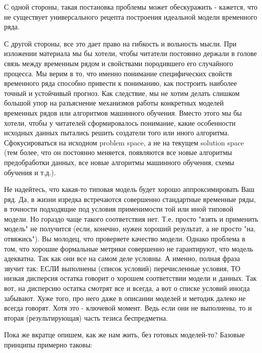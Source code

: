 С одной стороны, такая постановка проблемы может обескуражить -
кажется, что не существует универсального рецепта построения
идеальной модели временного ряда.

С другой стороны, все это дает право на гибкость и вольность мысли.
При изложении материала мы бы хотели, чтобы читатели постоянно
держали в голове связь между временным рядом и свойствами
породившего его случайного процесса.
Мы верим в то, что именно понимание специфических
свойств временного ряда способно привести к пониманию, как
построить наиболее точный и устойчивый прогноз. Как следствие, мы
не хотим делать слишком большой упор на разъяснение механизмов
работы конкретных моделей временных рядов или алгоритмов машинного
обучения. Вместо этого мы бы хотели, чтобы у читателей
сформировалось понимание, какие особенности исходных данных
пытались решить создатели того или иного алгоритма. Сфокусироваться
на исходном problem space, а не на текущем solution space
(тем более, что он постоянно меняется, появляются все новые алгоритмы
  предобработки данных, все новые алгоритмы машинного обучения, схемы
обучения и т.д.).

Не надейтесь, что какая-то типовая модель будет хорошо
аппроксимировать Ваш ряд. Да, в жизни изредка встречаются совершенно стандартные
временные ряды, в точности подходящие под условия применимости той
или иной типовой модели. Но гораздо чаще такого соответствия нет.
Т.е. просто "взять и применить модель" не получится (если, конечно,
нужен хороший результат, а не просто "на, отвяжись"). Вы молодец, что
проверяете качество модели. Однако проблема в том, что хорошие
формальные метрики совершенно не гарантируют, что модель адекватна.
Так как они все на самом деле условны. А именно, полная фраза звучит так:
ЕСЛИ выполнены (список условий) перечисленные условия,
ТО низкая дисперсия остатка говорит о хорошем соответствии модели и данных.
Так вот, на дисперсию остатка смотрят все и всегда, а вот о списке
условий иногда забывают. Хуже того, про него даже в описании моделей
и методик далеко не всегда говорят. Хотя это - ключевой момент. Ведь
если они не выполнены, то и вторая (результирующая) часть тезиса беспредметна.

Пока же вкратце опишем, как же нам жить,
без готовых моделей-то? Базовые принципы примерно таковы:

